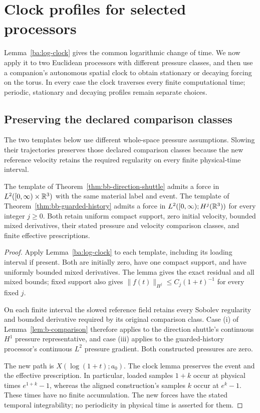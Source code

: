 \section{Clock profiles for selected processors}\label{sec:clocks}

Lemma~\ref{ba:log-clock} gives the common logarithmic change of time.
We now apply it to two Euclidean processors with different pressure
classes, and then use a companion's autonomous spatial clock to obtain
stationary or decaying forcing on the torus. In every case the clock
traverses every finite computational time; periodic, stationary and
decaying profiles remain separate choices.

\subsection{Preserving the declared comparison classes}
\label{sec:bb-late-logclock}

The two templates below use different whole-space pressure assumptions.
Slowing their trajectories preserves those declared comparison classes
because the new reference velocity retains the required regularity on
every finite physical-time interval.

\begin{proposition}\label{prop:bb-late-logclock}
The template of Theorem~\ref{thm:bb-direction-shuttle} admits a force
in $L^2([0,\infty)\times\mathbb R^3)$ with the same material label and
event.  The template of Theorem~\ref{thm:bb-guarded-history} admits
a force in $L^2([0,\infty);H^j(\mathbb R^3))$ for every integer $j\ge0$.
Both retain uniform compact support, zero initial velocity, bounded
mixed derivatives, their stated pressure and velocity comparison
classes, and finite effective prescriptions.
\end{proposition}
\begin{proof}\label{proof:bb-late-logclock}
Apply Lemma~\ref{ba:log-clock} to each template, including its loading
interval if present. Both are initially zero, have one compact support,
and have uniformly bounded mixed derivatives. The lemma gives the exact
residual and all mixed bounds; fixed support also gives
$\|f(t)\|_{H^j}\le C_j(1+t)^{-1}$ for every fixed $j$.

On each finite interval the slowed reference field retains every Sobolev
regularity and bounded derivative required by its original comparison
class. Case (i) of Lemma~\ref{lem:b-comparison} therefore applies to the
direction shuttle's continuous $H^1$ pressure representative, and case
(iii) applies to the guarded-history processor's continuous $L^2$
pressure gradient. Both constructed pressures are zero.

The new path is $X(\log(1+t);a_0)$. The clock lemma preserves the event
and the effective prescription. In particular, loaded samples $1+k$
occur at physical times $e^{1+k}-1$, whereas the aligned construction's
samples $k$ occur at $e^k-1$. These times have no finite accumulation.
The new forces have the stated temporal integrability; no periodicity
in physical time is asserted for them.
\end{proof}

